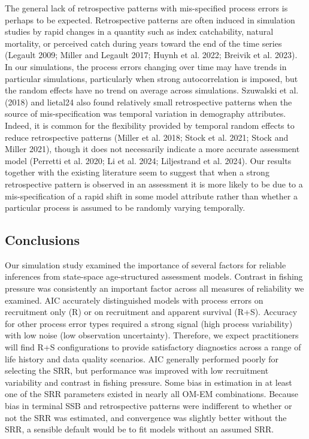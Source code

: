 \documentclass[
  12pt,
]{article}
\begin{document}
The general lack of retrospective patterns with mis-specified process
errors is perhaps to be expected. Retrospective patterns are often
induced in simulation studies by rapid changes in a quantity such as
index catchability, natural mortality, or perceived catch during years
toward the end of the time series (Legault 2009; Miller and Legault
2017; Huynh et al. 2022; Breivik et al. 2023). In our simulations, the
process errors changing over time may have trends in particular
simulations, particularly when strong autocorrelation is imposed, but
the random effects have no trend on average across simulations.
Szuwalski et al. (2018) and lietal24 also found relatively small
retrospective patterns when the source of mis-specification was temporal
variation in demography attributes. Indeed, it is common for the
flexibility provided by temporal random effects to reduce retrospective
patterns (Miller et al. 2018; Stock et al. 2021; Stock and Miller 2021),
though it does not necessarily indicate a more accurate assessment model
(Perretti et al. 2020; Li et al. 2024; Liljestrand et al. 2024). Our
results together with the existing literature seem to suggest that when
a strong retrospective pattern is observed in an assessment it is more
likely to be due to a mis-specification of a rapid shift in some model
attribute rather than whether a particular process is assumed to be
randomly varying temporally.

\hypertarget{conclusions}{%
\subsection*{Conclusions}\label{conclusions}}

Our simulation study examined the importance of several factors for
reliable inferences from state-space age-structured assessment models.
Contrast in fishing pressure was consistently an important factor across
all measures of reliability we examined. AIC accurately distinguished
models with process errors on recruitment only (R) or on recruitment and
apparent survival (R+S). Accuracy for other process error types required
a strong signal (high process variability) with low noise (low
observation uncertainty). Therefore, we expect practitioners will find
R+S configurations to provide satisfactory diagnostics across a range of
life history and data quality scenarios. AIC generally performed poorly
for selecting the SRR, but performance was improved with low recruitment
variability and contrast in fishing pressure. Some bias in estimation in
at least one of the SRR parameters existed in nearly all OM-EM
combinations. Because bias in terminal SSB and retrospective patterns
were indifferent to whether or not the SRR was estimated, and
convergence was slightly better without the SRR, a sensible default
would be to fit models without an assumed SRR.
\end{document}
